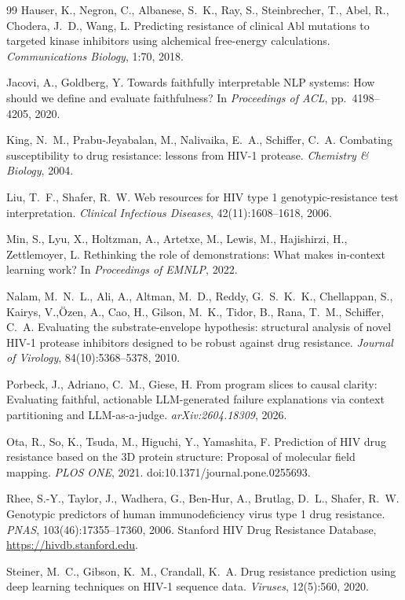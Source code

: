 \documentclass{article}
\begin{document}
\begin{thebibliography}{99}
 Hauser, K., Negron, C., Albanese, S.~K., Ray, S., Steinbrecher, T., Abel, R., Chodera, J.~D., Wang, L. Predicting resistance of clinical Abl mutations to targeted kinase inhibitors using alchemical free-energy calculations. \emph{Communications Biology}, 1:70, 2018.

 Jacovi, A., Goldberg, Y. Towards faithfully interpretable NLP systems: How should we define and evaluate faithfulness? In \emph{Proceedings of ACL}, pp.\ 4198--4205, 2020.

 King, N.~M., Prabu-Jeyabalan, M., Nalivaika, E.~A., Schiffer, C.~A. Combating susceptibility to drug resistance: lessons from HIV-1 protease. \emph{Chemistry \& Biology}, 2004.

 Liu, T.~F., Shafer, R.~W. Web resources for HIV type 1 genotypic-resistance test interpretation. \emph{Clinical Infectious Diseases}, 42(11):1608--1618, 2006.

 Min, S., Lyu, X., Holtzman, A., Artetxe, M., Lewis, M., Hajishirzi, H., Zettlemoyer, L. Rethinking the role of demonstrations: What makes in-context learning work? In \emph{Proceedings of EMNLP}, 2022.

 Nalam, M.~N.~L., Ali, A., Altman, M.~D., Reddy, G.~S.~K.~K., Chellappan, S., Kairys, V.,\"Ozen, A., Cao, H., Gilson, M.~K., Tidor, B., Rana, T.~M., Schiffer, C.~A. Evaluating the substrate-envelope hypothesis: structural analysis of novel HIV-1 protease inhibitors designed to be robust against drug resistance. \emph{Journal of Virology}, 84(10):5368--5378, 2010.

 Porbeck, J., Adriano, C.~M., Giese, H. From program slices to causal clarity: Evaluating faithful, actionable LLM-generated failure explanations via context partitioning and LLM-as-a-judge. \emph{arXiv:2604.18309}, 2026.

 Ota, R., So, K., Tsuda, M., Higuchi, Y., Yamashita, F. Prediction of HIV drug resistance based on the 3D protein structure: Proposal of molecular field mapping. \emph{PLOS ONE}, 2021. doi:10.1371/journal.pone.0255693.

 Rhee, S.-Y., Taylor, J., Wadhera, G., Ben-Hur, A., Brutlag, D.~L., Shafer, R.~W. Genotypic predictors of human immunodeficiency virus type 1 drug resistance. \emph{PNAS}, 103(46):17355--17360, 2006. Stanford HIV Drug Resistance Database, \url{https://hivdb.stanford.edu}.

 Steiner, M.~C., Gibson, K.~M., Crandall, K.~A. Drug resistance prediction using deep learning techniques on HIV-1 sequence data. \emph{Viruses}, 12(5):560, 2020.


\end{thebibliography}
\end{document}
